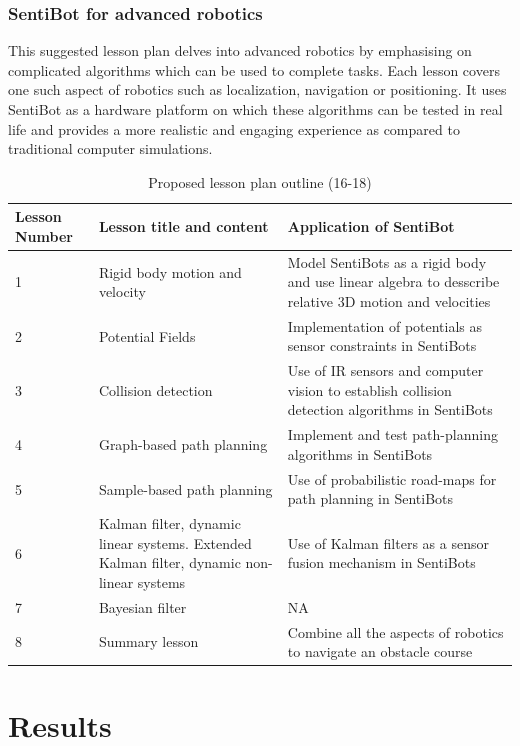 \documentclass[12pt]{article}
\begin{document}
\subsubsection{SentiBot for advanced robotics}
This suggested lesson plan delves into advanced robotics by emphasising on complicated algorithms which can be used to complete tasks. Each lesson covers one such aspect of robotics such as localization, navigation or positioning. It uses SentiBot as a hardware platform on which these algorithms can be tested in real life and provides a more realistic and engaging experience as compared to traditional computer simulations. 

\begin{table}[h]
	\centering
	\begin{tabularx}{\linewidth}{ | >{\setlength\hsize{.2\hsize}} X | >{\setlength\hsize{.5\hsize}} X | X | }
		Lesson Number & Lesson title and content & Application of SentiBot \\
		\hline
		1 &  Rigid body motion and velocity & Model SentiBots as a rigid body and use linear algebra to desscribe relative 3D motion and velocities \\
		2 &  Potential Fields &  Implementation of potentials as sensor constraints in SentiBots \\
		3 &  Collision detection & Use of IR sensors and computer vision to establish collision detection algorithms in SentiBots \\
		4 &  Graph-based path planning & Implement and test path-planning algorithms in SentiBots \\
		5 &  Sample-based path planning & Use of probabilistic road-maps for path planning in SentiBots \\
		6 &  Kalman filter, dynamic linear systems. Extended Kalman filter, dynamic non-linear systems & Use of Kalman filters as a sensor fusion mechanism in SentiBots \\
		7 &  Bayesian filter & NA\\
		8 &  Summary lesson & Combine all the aspects of robotics to navigate an obstacle course \\
	\end{tabularx}
	\caption{Proposed lesson plan outline (16-18)}
	\label{tab:lessonplan1}
\end{table}


\section{Results}
\end{document}
